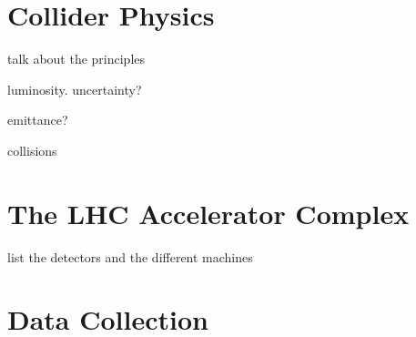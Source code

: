 



\cite{lhc}

\section{Collider Physics}
talk about the principles

luminosity. uncertainty?


emittance?

collisions

\section{The LHC Accelerator Complex}
list the detectors and the different machines
\section{Data Collection}
